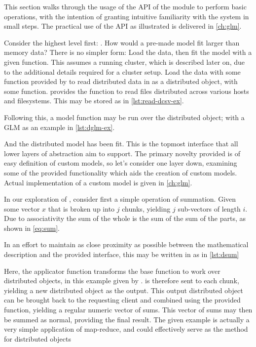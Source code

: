 This section walks through the usage of the API of the \lso{} module to perform basic operations, with the intention of granting intuitive familiarity with the system in small steps.
The practical use of the API as illustrated is delivered in \cref{ch:glm}.

Consider the highest level first: \lsm{}.
How would a pre-made model fit larger than memory data?
There is no simpler form: Load the data, then fit the model with a given function.
This assumes a running cluster, which is described later on, due to the additional details required for a cluster setup.
Load the data with some function provided by \lso{} to read distributed data in as a distributed object, with some  function.
\lso{} provides the  function to read  files distributed across various hosts and filesystems.
This may be stored as in \cref{lst:read-dcsv-ex}.


Following this, a model function may be run over the distributed object; with a GLM as an example in \cref{lst:dglm-ex}.


And the distributed model has been fit.
This is the topmost interface that all lower layers of abstraction aim to support.
The primary novelty provided is of easy definition of custom models, so let's consider one layer down, examining some of the provided functionality which aids the creation of custom models.
Actual implementation of a custom model is given in \cref{ch:glm}.

In our exploration of \lso{}, consider first a simple operation of summation.
Given some vector $x$ that is broken up into $j$ chunks, yielding $j$ sub-vectors of length $i$.
Due to associativity the sum of the whole is the sum of the sum of the parts, as shown in \cref{eq:sum}.


In an effort to maintain as close proximity as possible between the mathematical description and the provided interface, this may be written in \lso{} as in \cref{lst:dsum}


Here, the  applicator function transforms the base  function to work over distributed objects, in this example given by .
 is therefore sent to each chunk, yielding a new distributed object as the output.
This output distributed object can be brought back to the requesting client and combined using the provided  function, yielding a regular \R{} numeric vector of sums.
This vector of sums may then be summed as normal, providing the final result.
The given example is actually a very simple application of map-reduce, and could effectively serve as the  method for distributed objects

